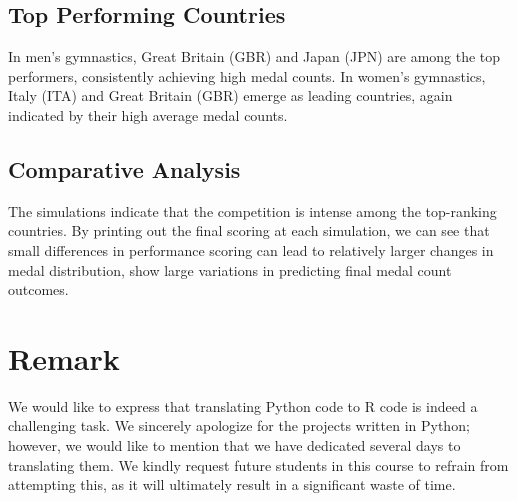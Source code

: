 \documentclass{article}
\theoremstyle{roman}
\begin{document}
\subsection{Top Performing Countries}
In men's gymnastics, Great Britain (GBR) and Japan (JPN) are among the top performers, consistently achieving high medal counts. In women's gymnastics, Italy (ITA) and Great Britain (GBR) emerge as leading countries, again indicated by their high average medal counts.
\subsection{Comparative Analysis}
The simulations indicate that the competition is intense among the top-ranking countries. By printing out the final scoring at each simulation, we can see that small differences in performance scoring can lead to relatively larger changes in medal distribution, show large variations in predicting final medal count outcomes.
\section*{Remark}
We would like to express that translating Python code to R code is indeed a challenging task. We sincerely apologize for the projects written in Python; however, we would like to mention that we have dedicated several days to translating them. We kindly request future students in this course to refrain from attempting this, as it will ultimately result in a significant waste of time.


\end{document}
